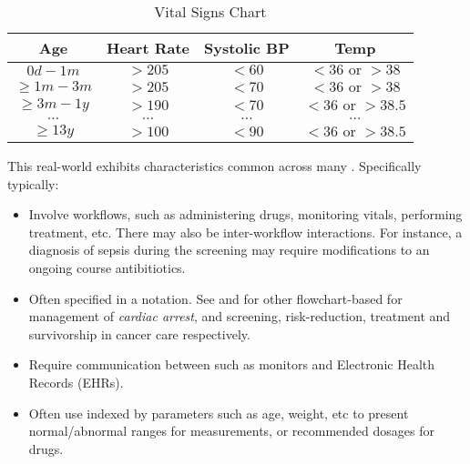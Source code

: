   \begin{table}
    \centering
    \begin{tabular}{ | c || c | c | c | }
      \hline
      \textbf{Age}            & \textbf{Heart Rate}   & \textbf{Systolic BP} & \textbf{Temp}  \\
      \hline
      $0d - 1m$               & $>205$                & $<60$                & $<36 \text{ or } >38$ \\
      \hline
      $\geq 1m - 3m$          & $>205$                & $<70$                & $<36 \text{ or } >38$ \\
      \hline
      $\geq 3m - 1y$          & $>190$                & $<70$                & $<36 \text{ or } >38.5$ \\
      \hline
      $\dots$                 & $\dots$               & $\dots$              & $\dots$ \\
      \hline
      $\geq 13y$              & $>100$                & $<90$                & $<36 \text{ or } >38.5$ \\
      \hline
    \end{tabular}
    \caption{Vital Signs Chart}\label{table:vital-signs}
  \end{table}

This real-world \BPG{} exhibits characteristics common
across many \BPGs{}. Specifically \BPGs{} typically:
\begin{itemize}
  \item Involve  workflows, such as administering drugs,
    monitoring vitals, performing treatment, etc. There may also be
    inter-workflow interactions. For instance, a diagnosis of sepsis during the
    screening may require modifications to an ongoing course antibitiotics.
  \item Often specified in a 
    notation. See \cite{AHAFlowcharts} and \cite{CancerCareFlowcharts} for other flowchart-based \BPGs{} for management of \emph{cardiac arrest}, and
    screening, risk-reduction, treatment and survivorship in
    cancer care respectively.
  \item Require communication between  such as
     monitors and Electronic Health Records (EHRs).
  \item Often use  indexed by parameters such as age, weight,
    etc to present normal/abnormal ranges for measurements, or recommended dosages for drugs.
\end{itemize}

